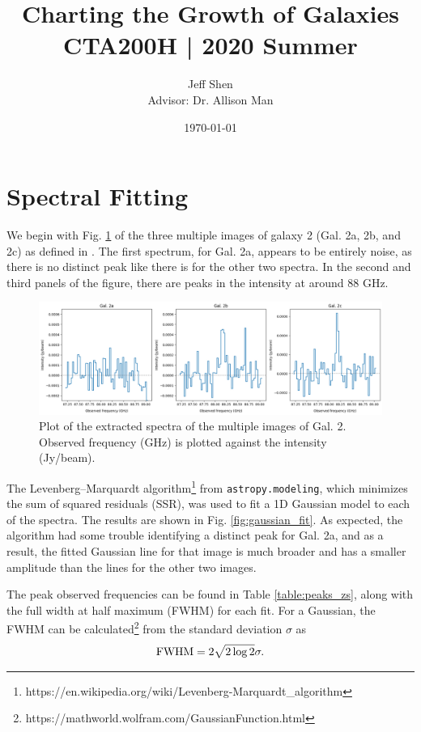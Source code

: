 \documentclass[11pt]{article}
\newcommand{\code}{\texttt}
\begin{document}
\title{\textbf{Charting the Growth of Galaxies} \\[0.25cm] \large{CTA200H | 2020 Summer}}
\author{Jeff Shen \\ Advisor: Dr. Allison Man}
\date{\today}
\maketitle

\section*{Spectral Fitting}

We begin with Fig. \ref{fig:initial_spectra} of the three multiple images of galaxy 2 (Gal. 2a, 2b, and 2c) as defined in \cite{MacKenzie2014}. The first spectrum, for Gal. 2a, appears to be entirely noise, as there is no distinct peak like there is for the other two spectra. In the second and third panels of the figure, there are peaks in the intensity at around 88 GHz. 

\begin{figure}[!htbp]
    \centering
    \includegraphics[width=\linewidth]{../figs/initial_spectra.png}
	\caption{Plot of the extracted spectra of the multiple images of Gal. 2. Observed frequency (GHz) is plotted against the intensity (Jy/beam).}
    \label{fig:initial_spectra}
\end{figure}

The Levenberg–Marquardt algorithm\footnote{https://en.wikipedia.org/wiki/Levenberg-Marquardt\_algorithm} from \code{astropy.modeling}, which minimizes the sum of squared residuals (SSR), was used to fit a 1D Gaussian model to each of the spectra. The results are shown in Fig. \ref{fig:gaussian_fit}. As expected, the algorithm had some trouble identifying a distinct peak for Gal. 2a, and as a result, the fitted Gaussian line for that image is much broader and has a smaller amplitude than the lines for the other two images.

The peak observed frequencies can be found in Table \ref{table:peaks_zs}, along with the full width at half maximum (FWHM) for each fit. For a Gaussian, the FWHM can be calculated\footnote{https://mathworld.wolfram.com/GaussianFunction.html} from the standard deviation $\sigma$ as 
\begin{align}\label{eqn:fwhm}
	\rm{FWHM} = 2\sqrt{2\log{2}}\sigma.
\end{align}
\end{document}

